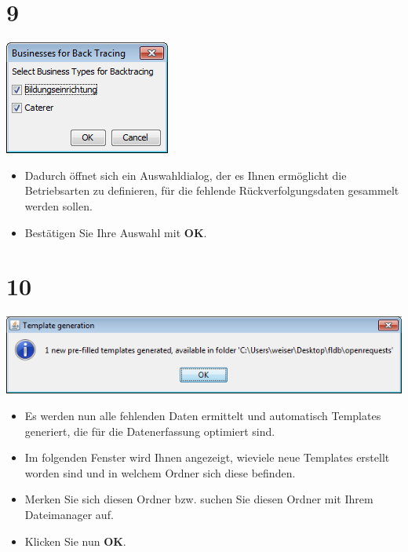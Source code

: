 \documentclass{beamer}
\begin{document}
\section{9}
\begin{frame}
	\begin{center}
  		\includegraphics[height=0.5\textheight]{9.png}
	\end{center}
	\begin{itemize}
		\item Dadurch öffnet sich ein Auswahldialog, der es Ihnen ermöglicht die Betriebsarten zu definieren, für die fehlende Rückverfolgungsdaten gesammelt werden sollen.
		\item Bestätigen Sie Ihre Auswahl mit \textbf{OK}.
	\end{itemize}
\end{frame}

\section{10}
\begin{frame}
	\begin{center}
  		\includegraphics[height=0.2\textheight]{10.png}
	\end{center}
	\begin{itemize}
		\item Es werden nun alle fehlenden Daten ermittelt und automatisch Templates generiert, die für die Datenerfassung optimiert sind.
		\item Im folgenden Fenster wird Ihnen angezeigt, wieviele neue Templates erstellt worden sind und in welchem Ordner sich diese befinden.
		\item Merken Sie sich diesen Ordner bzw. suchen Sie diesen Ordner mit Ihrem Dateimanager auf.
		\item Klicken Sie nun \textbf{OK}.
	\end{itemize}
\end{frame}
\end{document}
